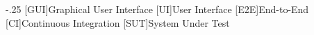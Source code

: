 
\begin{acronym}
    \itemsep-.25\baselineskip
    [GUI]{Graphical User Interface}
    [UI]{User Interface}
    [E2E]{End-to-End}
    [CI]{Continuous Integration}
    [SUT]{System Under Test}
\end{acronym}
